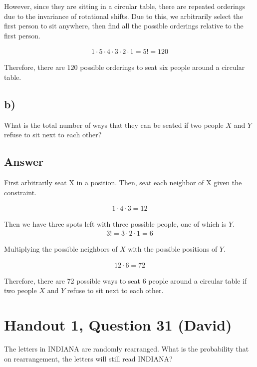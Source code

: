 \documentclass[11pt]{article}
\begin{document}
However, since they are sitting in a circular table, there are repeated orderings due to the invariance of rotational shifts. Due to this, we arbitrarily select the first person to sit anywhere, then find all the possible orderings relative to the first person. 

\begin{align*}
    1\cdot5\cdot4\cdot3\cdot2\cdot1=5!=120
\end{align*}

Therefore, there are $120$ possible orderings to seat six people around a circular table. 


\subsection*{b)}

What is the total number of ways that they can be seated
if two people \(X\) and \(Y\) refuse to sit next to each other?

\subsection*{Answer}
 First arbitrarily seat X in a position. Then, seat each neighbor of X given the constraint. 

 \begin{align*}
     1\cdot4\cdot3 = 12
 \end{align*}

Then we have three spots left with three possible people, one of which is \(Y\).
\begin{align*}
    3!=3\cdot2\cdot1=6
\end{align*}

Multiplying the possible neighbors of \(X\) with the possible positions of \(Y\).

\begin{align*}
    12\cdot 6 = 72
\end{align*}

Therefore, there are 72 possible ways to seat 6 people around a circular table if two people \(X\) and \(Y\) refuse to sit next to each other. 


\section*{Handout 1, Question 31 (David)}

The letters in INDIANA are randomly rearranged.
What is the probability that on rearrangement,
the letters will still read INDIANA?
\end{document}
